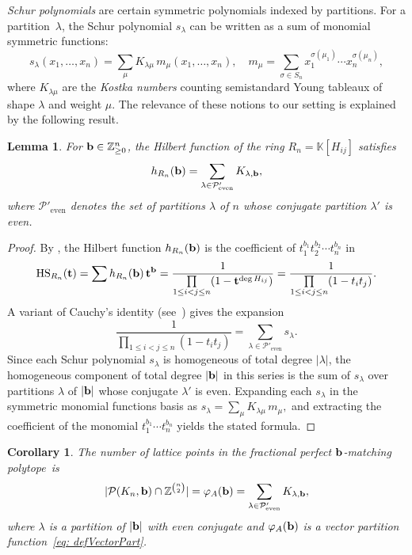 \documentclass[12pt,a4paper]{extarticle}
\newtheorem{lemma}[theorem]{Lemma}
\newtheorem{corollary}[theorem]{Corollary}
\theoremstyle{definition}
\newcommand{\Z}{\mathbb{Z}}
\newcommand{\K}{\mathbb{K}}
\begin{document}
\noindent
\emph{Schur polynomials} are certain symmetric polynomials indexed by partitions.
For a partition~$\lambda$, the Schur polynomial $s_\lambda$ can be written as a sum
of monomial symmetric functions:
\begin{equation}\label{eq: schur sum of monomial func}
 s_\lambda(x_1,\ldots,x_n) = \sum\limits_{\mu} K_{\lambda\mu}\, m_\mu (x_1,\ldots,x_n),  \quad m_\mu = \sum_{\sigma \in S_n} x_1^{\sigma(\mu_1)} \cdots x_n^{\sigma(\mu_n)},  
\end{equation}
where $K_{\lambda\mu}$ are the \emph{Kostka numbers} counting  semistandard Young tableaux of shape $\lambda$
and weight $\mu$.
The relevance of these notions to our setting is explained by the following result.
\begin{lemma}\label{lem: Hilbert-Kostka}
For ${\bf b}\in\mathbb{Z}_{\ge0}^n$, the Hilbert function of the ring $R_n=\K[H_{ij}]$ satisfies
$$
h_{R_n}({\bf b})
=
\sum_{\lambda\in\mathcal{P}'_{\mathrm{even}}}
K_{\lambda,{\bf b}},
$$
where $\mathcal{P}'_{\mathrm{even}}$ denotes the set of partitions $\lambda$ of $n$ whose conjugate
partition $\lambda'$ is even.
\end{lemma}
\begin{proof}
    By \cite[Lemma 8.16]{CCA}, the Hilbert function $h_{R_n}({\bf b})$ is the coefficient of $t_1^{b_1}t_2^{b_2}\cdots t_n^{b_n}$ in 
    \[
     {\rm HS}_{R_n}({\bf t}) = \sum  h_{R_n}({\bf b})\, {\bf t}^{\bf b} = \frac{1}{\prod\limits_{1\leq i<j\leq n} (1-\mathbf{t}^{\deg H_{ij}})} = \frac{1}{\prod\limits_{1\le i<j\le n} (1-t_i t_j)}.
    \]
A variant of Cauchy’s identity (see~\cite[p.~77]{Macdonald}) gives the expansion
$$
\frac{1}{\prod_{1\le i<j\le n} (1-t_i t_j)}
=
\sum_{\lambda\in\mathcal{P}'_{\mathrm{even}}} s_\lambda.
$$
Since each Schur polynomial $s_\lambda$ is homogeneous of total degree $|\lambda|$, the
homogeneous component of total degree $|{\bf b}|$ in this series is the sum of $s_\lambda$ over
partitions $\lambda$ of $|{\bf b}|$ whose conjugate $\lambda'$ is even.
Expanding each $s_\lambda$ in the symmetric monomial functions basis as
$
s_\lambda=\sum_{\mu} K_{\lambda\mu}\, m_\mu,
$
and extracting the coefficient of the monomial $t_1^{b_1}\cdots t_n^{b_n}$ yields the stated formula.
\end{proof}
\begin{corollary}
The number of lattice points in the fractional perfect ${\bf b}$-matching polytope~is
\[
|\mathcal{P}(K_n, {\bf b}) \cap \Z^{n \choose 2}| = \varphi_A({\bf b}) = \sum_{\lambda\in\mathcal{P}'_{\mathrm{even}}}
K_{\lambda,{\bf b}},
\]
where $\lambda$ is a partition of $|{\bf b}|$ with even conjugate and $\varphi_A({\bf b})$ is a vector partition function~\eqref{eq: defVectorPart}.
\end{corollary}
\end{document}

